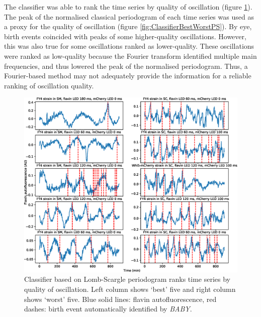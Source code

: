 The classifier was able to rank the time series by quality of oscillation (figure \ref{fig:ClassifierBestWorstTS}).
The peak of the normalised classical periodogram of each time series was used as a proxy for the quality of oscillation (figure \ref{fig:ClassifierBestWorstPS}).
By eye, birth events coincided with peaks of some higher-quality oscillations.
However, this was also true for some oscillations ranked as lower-quality.
These oscillations were ranked as low-quality because the Fourier transform identified multiple main frequencies, and thus lowered the peak of the normalised periodogram.
Thus, a Fourier-based method may not adequately provide the information for a reliable ranking of oscillation quality.

\begin{figure}[htbp]
  \centering
  \includegraphics[width=\textwidth]{10m_ClassifierBestWorstTS}
  \caption{
    Classifier based on Lomb-Scargle periodogram ranks time series by quality of oscillation.
    Left column shows `best' five and right column shows `worst' five.
    Blue solid lines: flavin autofluorescence, red dashes: birth event automatically identified by \textit{BABY}.
  }
  \label{fig:ClassifierBestWorstTS}
\end{figure}

